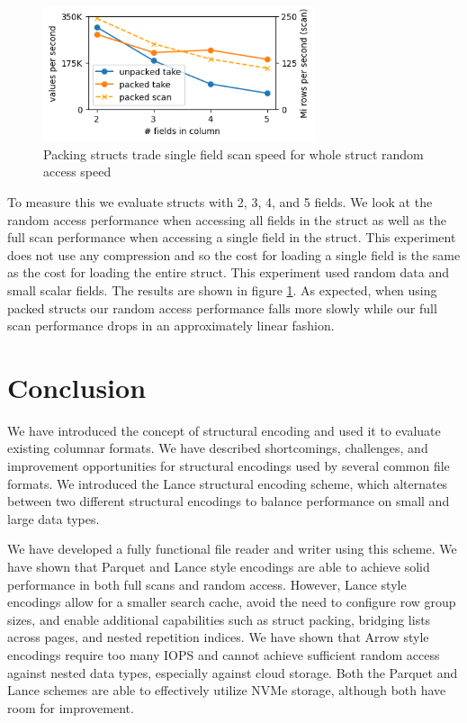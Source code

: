 \documentclass[sigconf, nonacm]{acmart}
\begin{document}
\begin{figure}[h]
    \centering
    \includegraphics[width=8cm]{figures/packed.png}
    \caption{Packing structs trade single field scan speed for whole struct random access speed}
    \label{fig:packed-take}
\end{figure}

To measure this we evaluate structs with 2, 3, 4, and 5 fields.  We look at the random access performance when accessing all fields in the struct as well as the full scan performance when accessing a single field in the struct.  This experiment does not use any compression and so the cost for loading a single field is the same as the cost for loading the entire struct.  This experiment used random data and small scalar fields.  The results are shown in figure \ref{fig:packed-take}.  As expected, when using packed structs our random access performance falls more slowly while our full scan performance drops in an approximately linear fashion.

\section{Conclusion}

We have introduced the concept of structural encoding and used it to evaluate existing columnar formats.  We have described shortcomings, challenges, and improvement opportunities for structural encodings used by several common file formats.  We introduced the Lance structural encoding scheme, which alternates between two different structural encodings to balance performance on small and large data types.

We have developed a fully functional file reader and writer using this scheme.  We have shown that Parquet and Lance style encodings are able to achieve solid performance in both full scans and random access.  However, Lance style encodings allow for a smaller search cache, avoid the need to configure row group sizes, and enable additional capabilities such as struct packing, bridging lists across pages, and nested repetition indices.  We have shown that Arrow style encodings require too many IOPS and cannot achieve sufficient random access against nested data types, especially against cloud storage.  Both the Parquet and Lance schemes are able to effectively utilize NVMe storage, although both have room for improvement.
\end{document}
